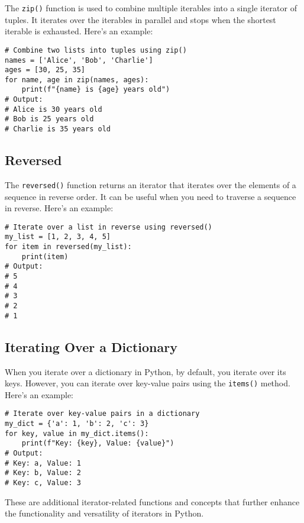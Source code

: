 The \texttt{zip()} function is used to combine multiple iterables into a single iterator of tuples. It iterates over the iterables in parallel and stops when the shortest iterable is exhausted. Here's an example:

\begin{lstlisting}[style=mystyle]
# Combine two lists into tuples using zip()
names = ['Alice', 'Bob', 'Charlie']
ages = [30, 25, 35]
for name, age in zip(names, ages):
    print(f"{name} is {age} years old")
# Output:
# Alice is 30 years old
# Bob is 25 years old
# Charlie is 35 years old
\end{lstlisting}

\subsection{Reversed}

The \texttt{reversed()} function returns an iterator that iterates over the elements of a sequence in reverse order. It can be useful when you need to traverse a sequence in reverse. Here's an example:

\begin{lstlisting}[style=mystyle]
# Iterate over a list in reverse using reversed()
my_list = [1, 2, 3, 4, 5]
for item in reversed(my_list):
    print(item)
# Output:
# 5
# 4
# 3
# 2
# 1
\end{lstlisting}

\subsection{Iterating Over a Dictionary}

When you iterate over a dictionary in Python, by default, you iterate over its keys. However, you can iterate over key-value pairs using the \texttt{items()} method. Here's an example:

\begin{lstlisting}[style=mystyle]
# Iterate over key-value pairs in a dictionary
my_dict = {'a': 1, 'b': 2, 'c': 3}
for key, value in my_dict.items():
    print(f"Key: {key}, Value: {value}")
# Output:
# Key: a, Value: 1
# Key: b, Value: 2
# Key: c, Value: 3
\end{lstlisting}
These are additional iterator-related functions and concepts that further enhance the functionality and versatility of iterators in Python.
